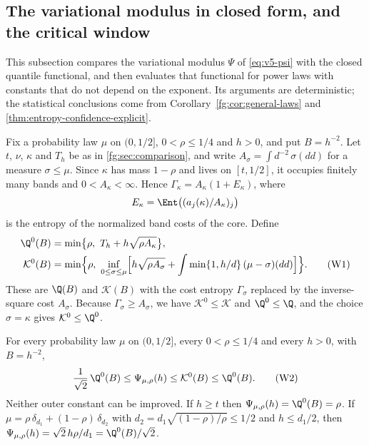 \subsection{The variational modulus in closed form, and the critical window}
\label{sec:psi-window}
This subsection compares the variational modulus $\Psi$ of
\eqref{eq:v5-psi} with the closed quantile functional, and then evaluates
that functional for power laws with constants that do not depend on the
exponent. Its arguments are deterministic; the statistical conclusions
come from Corollary~\ref{fg:cor:general-laws} and
\cref{thm:entropy-confidence-explicit}.

Fix a probability law $\mu$ on $(0,1/2]$, $0<\rho\le1/4$ and $h>0$, and
put $B=h^{-2}$. Let $t$, $\nu$, $\kappa$ and $T_h$ be as in
\cref{fg:sec:comparison}, and write
$A_\sigma=\int d^{-2}\,\sigma(dd)$ for a measure $\sigma\le\mu$. Since
$\kappa$ has mass $1-\rho$ and lives on $[t,1/2]$, it occupies finitely
many bands and $0<A_\kappa<\infty$. Hence
$\Gamma_\kappa=A_\kappa(1+E_\kappa)$, where
\[
 E_\kappa=\Ent\bigl((a_j(\kappa)/A_\kappa)_j\bigr)
\]
is the entropy of the normalized band costs of the core. Define
\begin{align*}
 \Q^0(B)&=\min\bigl\{\rho,\ T_h+h\sqrt{\rho A_\kappa}\bigr\},\\
 \mathcal K^0(B)&=\min\Bigl\{\rho,\ \inf_{0\le\sigma\le\mu}
 \Bigl[h\sqrt{\rho A_\sigma}
       +\int\min\{1,h/d\}\,(\mu-\sigma)(dd)\Bigr]\Bigr\}.
 \tag{W1}\label{eq:psi-window-defs}
\end{align*}
These are $\Q(B)$ and $\mathcal K(B)$ with the cost entropy $\Gamma_\sigma$
replaced by the inverse-square cost $A_\sigma$. Because
$\Gamma_\sigma\ge A_\sigma$, we have $\mathcal K^0\le\mathcal K$ and
$\Q^0\le\Q$, and the choice $\sigma=\kappa$ gives $\mathcal K^0\le\Q^0$.

\begin{proposition}
\label{prop:psi-closed}
For every probability law $\mu$ on $(0,1/2]$, every $0<\rho\le1/4$ and
every $h>0$, with $B=h^{-2}$,
\[
 \frac{1}{\sqrt2}\,\Q^0(B)\le\Psi_{\mu,\rho}(h)\le\mathcal K^0(B)\le\Q^0(B).
 \tag{W2}\label{eq:psi-window-chain}
\]
Neither outer constant can be improved. If $h\ge t$ then
$\Psi_{\mu,\rho}(h)=\Q^0(B)=\rho$. If
$\mu=\rho\,\delta_{d_1}+(1-\rho)\,\delta_{d_2}$ with
$d_2=d_1\sqrt{(1-\rho)/\rho}\le1/2$ and $h\le d_1/2$, then
$\Psi_{\mu,\rho}(h)=\sqrt2\,h\rho/d_1=\Q^0(B)/\sqrt2$.
\end{proposition}

